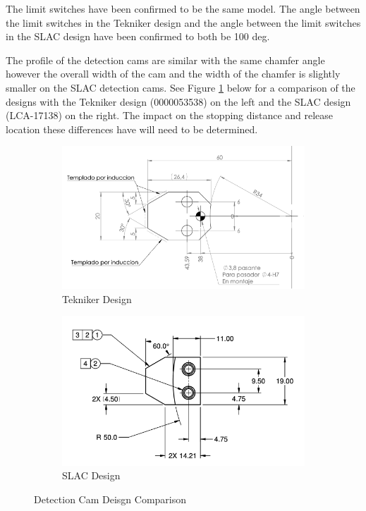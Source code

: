 \documentclass[SE,lsstdraft,authoryear,toc]{lsstdoc}
\begin{document}
The limit switches have been confirmed to be the same model. The angle
between the limit switches in the Tekniker design and the angle between
the limit switches in the SLAC design have been confirmed to both be 100
deg.

The profile of the detection cams are similar with the same chamfer
angle however the overall width of the cam and the width of the chamfer
is slightly smaller on the SLAC detection cams. See Figure \ref{fig:Figure_4} below for a
comparison of the designs with the Tekniker design (0000053538) on the
left and the SLAC design (LCA-17138) on the right. The impact on the
stopping distance and release location these differences have will need
to be determined.

\begin{figure}[ht]
  \centering
  \begin{subfigure}{0.45\linewidth}
    \centering
    \includegraphics[width=\linewidth]{media/teknikerDrawing.png}
    \caption{Tekniker Design}
  \end{subfigure}
  \begin{subfigure}{0.45\linewidth}
    \centering
    \includegraphics[width=\linewidth]{media/slacDrawing.png}
    \caption{SLAC Design}
  \end{subfigure}
  \caption{Detection Cam Deisgn Comparison}
  \label{fig:Figure_4}
\end{figure}
\end{document}
